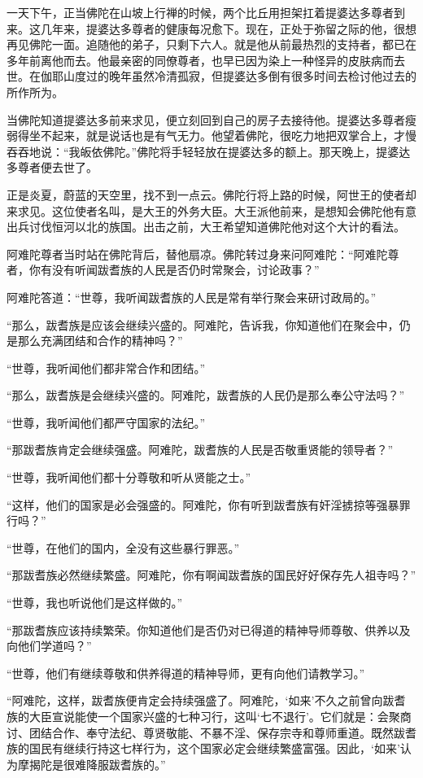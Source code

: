 \documentclass[12pt,twoside,openany]{book}
\begin{document}
一天下午，正当佛陀在山坡上行禅的时候，两个比丘用担架扛着提婆达多尊者到来。这几年来，提婆达多尊者的健康每况愈下。现在，正处于弥留之际的他，很想再见佛陀一面。追随他的弟子，只剩下六人。就是他从前最热烈的支持者，都已在多年前离他而去。他最亲密的同僚尊者，也早已因为染上一种怪异的皮肤病而去世。在伽耶山度过的晚年虽然冷清孤寂，但提婆达多倒有很多时间去检讨他过去的所作所为。

当佛陀知道提婆达多前来求见，便立刻回到自己的房子去接待他。提婆达多尊者瘦弱得坐不起来，就是说话也是有气无力。他望着佛陀，很吃力地把双掌合上，才慢吞吞地说：“我皈依佛陀。”佛陀将手轻轻放在提婆达多的额上。那天晚上，提婆达多尊者便去世了。

正是炎夏，蔚蓝的天空里，找不到一点云。佛陀行将上路的时候，阿世王的使者却来求见。这位使者名叫，是大王的外务大臣。大王派他前来，是想知会佛陀他有意出兵讨伐恒河以北的族国。出击之前，大王希望知道佛陀他对这个大计的看法。

阿难陀尊者当时站在佛陀背后，替他扇凉。佛陀转过身来问阿难陀：“阿难陀尊者，你有没有听闻跋耆族的人民是否仍时常聚会，讨论政事？”

阿难陀答道：“世尊，我听闻跋耆族的人民是常有举行聚会来研讨政局的。”

“那么，跋耆族是应该会继续兴盛的。阿难陀，告诉我，你知道他们在聚会中，仍是那么充满团结和合作的精神吗？”

“世尊，我听闻他们都非常合作和团结。”

“那么，跋耆族是会继续兴盛的。阿难陀，跋耆族的人民仍是那么奉公守法吗？”

“世尊，我听闻他们都严守国家的法纪。”

“那跋耆族肯定会继续强盛。阿难陀，跋耆族的人民是否敬重贤能的领导者？”

“世尊，我听闻他们都十分尊敬和听从贤能之士。”

“这样，他们的国家是必会强盛的。阿难陀，你有听到跋耆族有奸淫掳掠等强暴罪行吗？”

“世尊，在他们的国内，全没有这些暴行罪恶。”

“那跋耆族必然继续繁盛。阿难陀，你有啊闻跋耆族的国民好好保存先人祖寺吗？”

“世尊，我也听说他们是这样做的。”

“那跋耆族应该持续繁荣。你知道他们是否仍对已得道的精神导师尊敬、供养以及向他们学道吗？”

“世尊，他们有继续尊敬和供养得道的精神导师，更有向他们请教学习。”

“阿难陀，这样，跋耆族便肯定会持续强盛了。阿难陀，‘如来’不久之前曾向跋耆族的大臣宣说能使一个国家兴盛的七种习行，这叫‘七不退行’。它们就是：会聚商讨、团结合作、奉守法纪、尊贤敬能、不暴不淫、保存宗寺和尊师重道。既然跋耆族的国民有继续行持这七样行为，这个国家必定会继续繁盛富强。因此，‘如来’认为摩揭陀是很难降服跋耆族的。”
\end{document}
